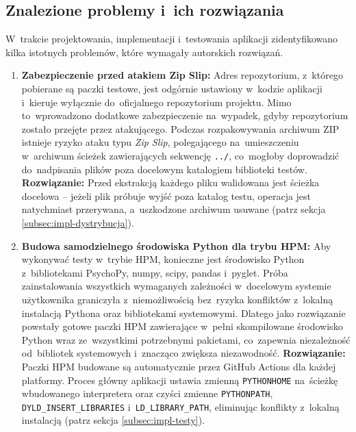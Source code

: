 \documentclass[12pt, a4paper, oneside]{report}
\begin{document}
\subsection{Znalezione problemy i~ich rozwiązania}
\label{subsec:problemy}

W~trakcie projektowania, implementacji i~testowania aplikacji zidentyfikowano
kilka istotnych problemów, które wymagały autorskich rozwiązań.

\begin{enumerate}

	\item \textbf{Zabezpieczenie przed atakiem Zip Slip:}
	      Adres repozytorium, z~którego pobierane są paczki testowe, jest odgórnie
	      ustawiony w~kodzie aplikacji i~kieruje wyłącznie do~oficjalnego repozytorium
	      projektu. Mimo to~wprowadzono dodatkowe zabezpieczenie na~wypadek, gdyby
	      repozytorium zostało przejęte przez atakującego. Podczas rozpakowywania
	      archiwum ZIP istnieje ryzyko ataku typu \textit{Zip Slip}, polegającego
	      na~umieszczeniu w~archiwum ścieżek zawierających sekwencję \texttt{../},
	      co~mogłoby doprowadzić do~nadpisania plików poza docelowym katalogiem
	      biblioteki testów.
	      \textbf{Rozwiązanie:} Przed ekstrakcją każdego pliku walidowana jest ścieżka
	      docelowa -- jeżeli plik próbuje wyjść poza katalog testu, operacja jest
	      natychmiast przerywana, a~uszkodzone archiwum usuwane (patrz sekcja
	      \ref{subsec:impl-dystrybucja}).

	\item \textbf{Budowa samodzielnego środowiska Python dla trybu HPM:}
	      Aby wykonywać testy w~trybie HPM, konieczne jest środowisko Python
	      z~bibliotekami PsychoPy, numpy, scipy, pandas i~pyglet. Próba
	      zainstalowania wszystkich wymaganych zależności w~docelowym systemie
	      użytkownika graniczyła z~niemożliwością bez~ryzyka konfliktów z~lokalną
	      instalacją Pythona oraz bibliotekami systemowymi. Dlatego jako rozwiązanie
	      powstały gotowe paczki HPM zawierające w~pełni skompilowane środowisko
	      Python wraz ze~wszystkimi potrzebnymi pakietami, co~zapewnia niezależność
	      od~bibliotek systemowych i~znacząco zwiększa niezawodność.
	      \textbf{Rozwiązanie:} Paczki HPM budowane są automatycznie przez GitHub
	      Actions dla każdej platformy. Proces główny aplikacji ustawia zmienną
	      \texttt{PYTHONHOME} na~ścieżkę wbudowanego interpretera oraz czyści zmienne
	      \texttt{PYTHONPATH}, \texttt{DYLD\_INSERT\_LIBRARIES}
	      i~\texttt{LD\_LIBRARY\_PATH}, eliminując konflikty z~lokalną instalacją
	      (patrz sekcja \ref{subsec:impl-testy}).


\end{enumerate}
\end{document}
